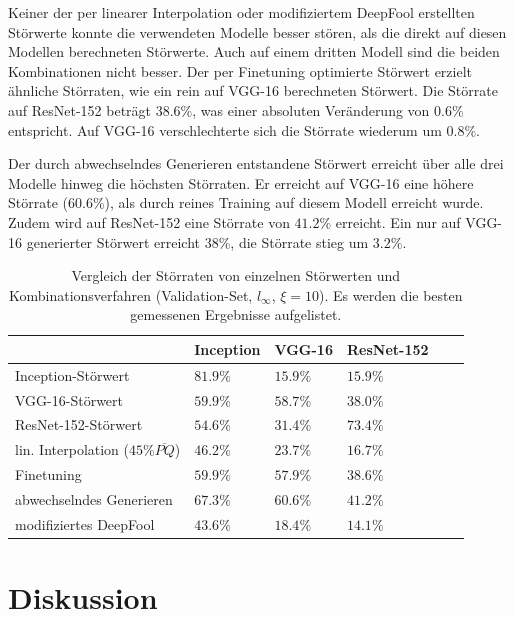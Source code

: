 \documentclass{FFHS_Thesis_Additions/ffhsthesis}
\begin{document}
Keiner der per linearer Interpolation oder modifiziertem DeepFool erstellten Störwerte konnte die verwendeten Modelle besser stören, als die direkt auf diesen Modellen berechneten Störwerte. Auch auf einem dritten Modell sind die beiden Kombinationen nicht besser.
Der per Finetuning optimierte Störwert erzielt ähnliche Störraten, wie ein rein auf VGG-16 berechneten Störwert. 
Die Störrate auf ResNet-152 beträgt $38.6\%$, was einer absoluten Veränderung von $0.6\%$ entspricht. Auf VGG-16 verschlechterte sich die Störrate wiederum um $0.8\%$.

Der durch abwechselndes Generieren entstandene Störwert erreicht über alle drei Modelle hinweg die höchsten Störraten. 
Er erreicht auf VGG-16 eine höhere Störrate ($60.6\%$), als durch reines Training auf diesem Modell erreicht wurde. 
Zudem wird auf ResNet-152 eine Störrate von $41.2\%$ erreicht. 
Ein nur auf VGG-16 generierter Störwert erreicht $38\%$, die Störrate stieg um $3.2\%$.

\begin{table}[]
\centering
\caption{Vergleich der Störraten von einzelnen Störwerten und Kombinationsverfahren (Validation-Set, $l_\infty$, $\xi=10$). Es werden die besten gemessenen Ergebnisse aufgelistet.}
\begin{tabular}{|l|l|l|l|l|l|}
\hline

											&	Inception	&	VGG-16		&	ResNet-152		\\ \hline
Inception-Störwert							&	$81.9\%$		&	$15.9\%$	&	$15.9\%$		\\
VGG-16-Störwert								&	$59.9\%$		&	$58.7\%$	&	$38.0\%$		\\
ResNet-152-Störwert							&	$54.6\%$		&	$31.4\%$	&	$73.4\%$		\\ \hline
lin. Interpolation ($45\% \overline{PQ}$)	&	$46.2\%$		&	$23.7\%$	&	$16.7\%$		\\
Finetuning									&	$59.9\%$		&	$57.9\%$	&	$38.6\%$		\\
abwechselndes Generieren						&	$67.3\%$		&	$60.6\%$	&	$41.2\%$		\\
modifiziertes DeepFool						&	$43.6\%$		&	$18.4\%$	&	$14.1\%$		\\


\hline 
\end{tabular}
\label{tbl_vergleich_comb}
\end{table}


    
\chapter{Diskussion}
\end{document}
